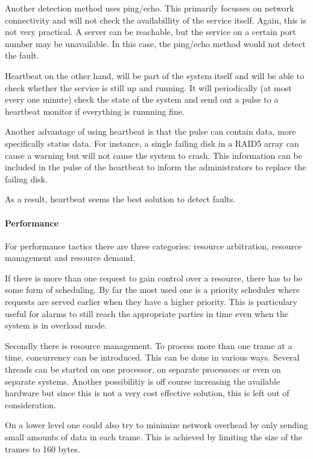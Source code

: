 \npar Another detection method uses ping/echo. This primarily focusses on
network connectivity and will not check the availabillity of the service itself.
Again, this is not very practical. A server can be reachable, but the service on
a certain port number may be unavailable. In this case, the ping/echo
method would not detect the fault.

\npar Heartbeat on the other hand, will be part of the system itself and will be
able to check whether the service is still up and running. It will periodically
(at most every one minute) check the state of the system and send out a pulse
to a heartbeat monitor if everything is runnning fine.

\npar Another advantage of using heartbeat is that the pulse can contain data,
more specifically status data. For instance, a single failing disk in a RAID5
array can cause a warning but will not cause the system to crash. This
information can be included in the pulse of the heartbeat to inform the
administrators to replace the failing disk.

\npar As a result, heartbeat seems the best solution to detect faults.

% 
\paragraph{Performance} 

\npar For performance tactics there are three categories: resource
arbitration, resource management and resource demand.

\npar If there is more than one request to gain control over a resource, there
has to be some form of scheduling. By far the most used one is a priority
scheduler where requests are served earlier when they have a higher priority.
This is particulary useful for alarms to still reach the appropriate parties in
time even when the system is in overload mode. 

\npar Secondly there is resource management. To process more than one trame at a
time, concurrency can be introduced. This can be done in various ways. Several
threads can be started on one processor, on separate processors or even on
separate systems. Another possibilitiy is off course increasing the available
hardware but since this is not a very cost effective solution, this is left out
of consideration.

\npar On a lower level one could also try to minimize network overhead by
only sending small amounts of data in each trame. This is achieved by
limiting the size of the trames to 160 bytes.

